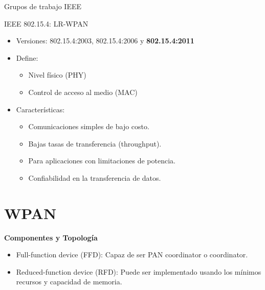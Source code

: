 \documentclass[aspectratio=169]{beamer}
\begin{document}
\begin{frame}{Grupos de trabajo IEEE}
\end{frame}

\begin{frame}{IEEE 802.15.4: LR-WPAN}
	\begin{itemize}
		\item Versiones: 802.15.4:2003, 802.15.4:2006 y \textbf{802.15.4:2011}
		\item Define:
		\begin{itemize}
			\item Nivel físico (PHY)
			\item Control de acceso al medio (MAC)
		\end{itemize}
		\item Características:
		\begin{itemize}
			\item Comunicaciones simples de bajo costo. 
			\item Bajas tasas de transferencia (throughput).
			\item Para aplicaciones con limitaciones de potencia.
			\item Confiabilidad en la transferencia de datos.
		\end{itemize}
	\end{itemize}
	
\end{frame}

\section{WPAN}

\begin{frame}{\textbf{Componentes y Topología}}
\begin{minipage}[c]{1.0\linewidth}

	\begin{minipage}[c]{0.6\linewidth}
		\begin{itemize}
			\item Full-function device (FFD): Capaz de ser PAN coordinator o coordinator. 
			\vspace{10px}
			\item Reduced-function device (RFD): Puede ser implementado usando los mínimos recursos y capacidad de memoria.
			\vspace{10px}
	  	\end{itemize}	
	\end{minipage}

	\begin{minipage}[c]{0.35\linewidth}
		\begin{figure}[H]
		\end{figure}	  	  	
	\end{minipage}

\end{minipage}
\end{frame}
\end{document}
